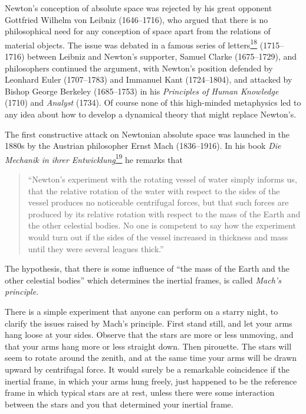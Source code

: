 Newton's conception of absolute space was rejected by his great opponent
Gottfried Wilhelm von Leibniz (1646--1716), who argued that there is no
philosophical need for any conception of space apart from the relations of
material objects. The issue was debated in a famous series of
letters\hyperref[ch1-ref-18]{\textsuperscript{18}} (1715--1716) between
Leibniz and Newton's supporter, Samuel Clarke (1675--1729), and philosophers
continued the argument, with Newton's position defended by Leonhard Euler
(1707--1783) and Immanuel Kant (1724--1804), and attacked by Bishop George
Berkeley (1685--1753) in his \emph{Principles of Human Knowledge} (1710) and
\emph{Analyst} (1734). Of course none of this high-minded metaphysics led to
any idea about how to develop a dynamical theory that might replace Newton's.

The first constructive attack on Newtonian absolute space was launched in the
1880s by the Austrian philosopher Ernst Mach (1836--1916). In his book
\emph{Die Mechanik in ihrer
Entwicklung}\hyperref[ch1-ref-19]{\textsuperscript{19}} he remarks that

\begin{quote}
``Newton's experiment with the rotating vessel of water simply informs us,
that the relative rotation of the water with respect to the sides of the
vessel produces no noticeable centrifugal forces, but that such forces are
produced by its relative rotation with respect to the mass of the Earth and
the other celestial bodies. No one is competent to say how the experiment
would turn out if the sides of the vessel increased in thickness and mass
until they were several leagues thick.''
\end{quote}

The hypothesis, that there is some influence of ``the mass of the Earth and
the other celestial bodies'' which determines the inertial frames, is called
\emph{Mach's principle}.

There is a simple experiment that anyone can perform on a starry night, to
clarify the issues raised by Mach's principle. First stand still, and let your
arms hang loose at your sides. Observe that the stars are more or less
unmoving, and that your arms hang more or less straight down. Then pirouette.
The stars will seem to rotate around the zenith, and at the same time your
arms will be drawn upward by centrifugal force. It would surely be a
remarkable coincidence if the inertial frame, in which your arms hung freely,
just happened to be the reference frame in which typical stars are at rest,
unless there were some interaction between the stars and you that determined
your inertial frame.

